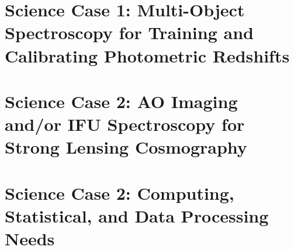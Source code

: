 \documentclass[12pt]{report}
\begin{document}
\pagestyle{fancy}
\fancyfoot{}%
\fancyfoot[R]{\thepage}  %

\fancyhead[R]{}
\renewcommand{\footrulewidth}{1pt}

\chapter{Science Case 1: Multi-Object Spectroscopy for Training and Calibrating Photometric Redshifts}









\chapter{Science Case 2: AO Imaging and/or IFU Spectroscopy for Strong Lensing Cosmography}






\chapter{Science Case 2: Computing, Statistical, and Data Processing Needs}










 
\end{document}
